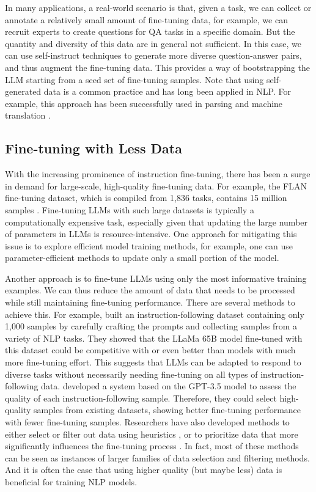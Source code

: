 In many applications, a real-world scenario is that, given a task, we can collect or annotate a relatively small amount of fine-tuning data, for example, we can recruit experts to create questions for QA tasks in a specific domain. But the quantity and diversity of this data are in general not sufficient. In this case, we can use self-instruct techniques to generate more diverse question-answer pairs, and thus augment the fine-tuning data. This provides a way of bootstrapping the LLM starting from a seed set of fine-tuning samples. Note that using self-generated data is a common practice and has long been applied in NLP. For example, this approach has been successfully used in parsing and machine translation \cite{charniak:1997statistical,sennrich-etal:2016improving}.

\subsection{Fine-tuning with Less Data}

\noindent With the increasing prominence of instruction fine-tuning, there has been a surge in demand for large-scale, high-quality fine-tuning data. For example, the FLAN fine-tuning dataset, which is compiled from 1,836 tasks, contains 15 million samples \cite{longpre-etal:2023flan}. Fine-tuning LLMs with such large datasets is typically a computationally expensive task, especially given that updating the large number of parameters in LLMs is resource-intensive. One approach for mitigating this issue is to explore efficient model training methods, for example, one can use parameter-efficient methods to update only a small portion of the model.

Another approach is to fine-tune LLMs using only the most informative training examples. We can thus reduce the amount of data that needs to be processed while still maintaining fine-tuning performance. There are several methods to achieve this. For example, \citet{zhou-etal:2023lima} built an instruction-following dataset containing only 1,000 samples by carefully crafting the prompts and collecting samples from a variety of NLP tasks. They showed that the LLaMa 65B model fine-tuned with this dataset could be competitive with or even better than models with much more fine-tuning effort. This suggests that LLMs can be adapted to respond to diverse tasks without necessarily needing fine-tuning on all types of instruction-following data. \citet{chen-etal:2024alpagasus} developed a system based on the GPT-3.5 model to assess the quality of each instruction-following sample. Therefore, they could select high-quality samples from existing datasets, showing better fine-tuning performance with fewer fine-tuning samples. Researchers have also developed methods to either select or filter out data using heuristics \cite{zhao-etal:2024long,ge-etal:2024clustering}, or to prioritize data that more significantly influences the fine-tuning process \cite{xia-etal:2024less}. In fact, most of these methods can be seen as instances of larger families of data selection and filtering methods. And it is often the case that using higher quality (but maybe less) data is beneficial for training NLP models.

